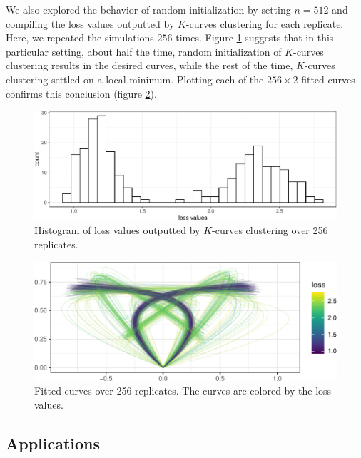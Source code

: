 \documentclass[
  11pt,
]{article}
\theoremstyle{definition}
\theoremstyle{definition}
\theoremstyle{definition}
\theoremstyle{definition}
\theoremstyle{remark}
\begin{document}
We also explored the behavior of random initialization by setting \(n = 512\) and compiling the loss values outputted by \(K\)-curves clustering for each replicate.
Here, we repeated the simulations \(256\) times.
Figure \ref{fig:repeat-losses} suggests that in this particular setting, about half the time, random initialization of \(K\)-curves clustering results in the desired curves, while the rest of the time, \(K\)-curves clustering settled on a local minimum.
Plotting each of the \(256 \times 2\) fitted curves confirms this conclusion (figure \ref{fig:repeat-curves}).

\begin{figure}[H]

{\centering \includegraphics{draft_files/figure-latex/repeat-losses-1} 

}

\caption{Histogram of loss values outputted by $K$-curves clustering over 256 replicates.}\label{fig:repeat-losses}
\end{figure}

\begin{figure}[H]

{\centering \includegraphics{draft_files/figure-latex/repeat-curves-1} 

}

\caption{Fitted curves over 256 replicates. The curves are colored by the loss values.}\label{fig:repeat-curves}
\end{figure}

\hypertarget{applications-1}{%
\subsection{Applications}\label{applications-1}}
\end{document}
